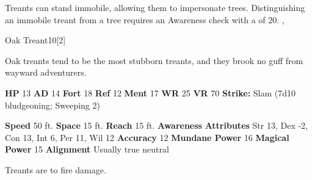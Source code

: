         Treants can stand immobile, allowing them to impersonate trees.
        Distinguishing an immobile treant from a tree requires an Awareness check with a  of 20.
  ,
  \begin{monsubsection}{Oak Treant}{10}[2]
    \vspace{-1em}\vspace{-1em}
    \vspace{0em}

    
        Oak treants tend to be the most stubborn treants, and they brook no guff from wayward adventurers.
      
    

    \begin{spellcontent}
      \begin{spelltargetinginfo}
        \pari \textbf{HP} 13 \monsep
          \textbf{AD} 14 \monsep
          \textbf{Fort} 18 \monsep
          \textbf{Ref} 12 \monsep
          \textbf{Ment} 17
        \pari \textbf{WR} 25 \monsep
        \textbf{VR} 70
        \pari \textbf{Strike:}
            Slam  (7d10 bludgeoning; Sweeping 2)
      \end{spelltargetinginfo}
    \end{spellcontent}
    \begin{monsterfooter}
      \pari \textbf{Speed} 50 ft. \monsep
        \textbf{Space} 15 ft. \monsep
        \textbf{Reach} 15 ft.
      \pari \textbf{Awareness} 
      \pari \textbf{Attributes}
        Str 13, Dex -2,
        Con 13, Int 6,
        Per 11, Wil 12
      \pari \textbf{Accuracy} 12 \monsep
        \textbf{Mundane Power} 16 \monsep
      \textbf{Magical Power} 15
      \pari \textbf{Alignment} Usually true neutral
    \end{monsterfooter}
  \end{monsubsection}
        Treants are  to fire damage.
      
